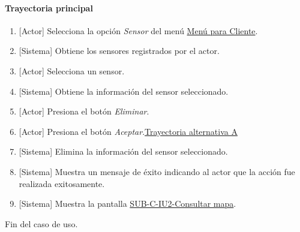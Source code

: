 \paragraph{Trayectoria principal}
	\begin{enumerate}
		\item {[Actor]} Selecciona la opción \textit{Sensor} del menú \hyperref[fig:menu-cliente]{Menú para Cliente}.
		\item {[Sistema]} Obtiene los sensores registrados por el actor.
		\item {[Actor]} Selecciona un sensor.
		\item {[Sistema]} Obtiene la información del sensor seleccionado.
		\item {[Actor]} Presiona el botón \textit{Eliminar}.
		\item {[Actor]} Presiona el botón \textit{Aceptar}.\hyperref[SUB-U-CU13:TA]{Trayectoria alternativa A}
		\item {[Sistema]} Elimina la información del sensor seleccionado.
		\item {[Sistema]} Muestra un mensaje de éxito indicando al actor que la acción fue realizada exitosamente.
		\item \label{SUB-U-CU15:Pantalla} {[Sistema]} Muestra la pantalla \hyperref[fig:sub-c-iu2]{SUB-C-IU2-Consultar mapa}.
	\end{enumerate}
	Fin del caso de uso.

